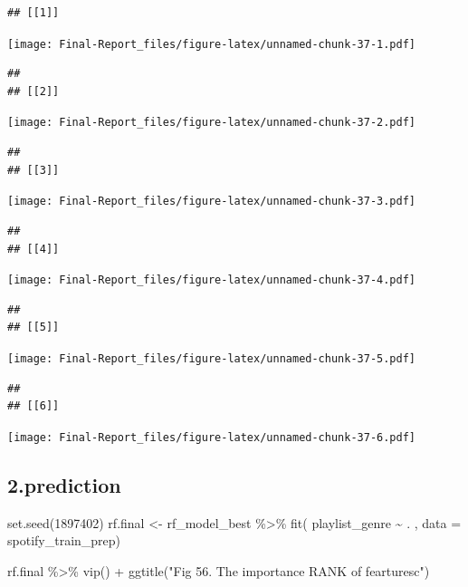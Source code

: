 \documentclass[
]{article}
\newenvironment{Shaded}{\begin{snugshade}}{\end{snugshade}}
\newcommand{\AttributeTok}[1]{\textcolor[rgb]{0.77,0.63,0.00}{#1}}
\newcommand{\DecValTok}[1]{\textcolor[rgb]{0.00,0.00,0.81}{#1}}
\newcommand{\FunctionTok}[1]{\textcolor[rgb]{0.00,0.00,0.00}{#1}}
\newcommand{\NormalTok}[1]{#1}
\newcommand{\OtherTok}[1]{\textcolor[rgb]{0.56,0.35,0.01}{#1}}
\newcommand{\SpecialCharTok}[1]{\textcolor[rgb]{0.00,0.00,0.00}{#1}}
\newcommand{\StringTok}[1]{\textcolor[rgb]{0.31,0.60,0.02}{#1}}
\begin{document}
\begin{verbatim}
## [[1]]
\end{verbatim}

\texttt{[image: Final-Report\_files/figure-latex/unnamed-chunk-37-1.pdf]}

\begin{verbatim}
## 
## [[2]]
\end{verbatim}

\texttt{[image: Final-Report\_files/figure-latex/unnamed-chunk-37-2.pdf]}

\begin{verbatim}
## 
## [[3]]
\end{verbatim}

\texttt{[image: Final-Report\_files/figure-latex/unnamed-chunk-37-3.pdf]}

\begin{verbatim}
## 
## [[4]]
\end{verbatim}

\texttt{[image: Final-Report\_files/figure-latex/unnamed-chunk-37-4.pdf]}

\begin{verbatim}
## 
## [[5]]
\end{verbatim}

\texttt{[image: Final-Report\_files/figure-latex/unnamed-chunk-37-5.pdf]}

\begin{verbatim}
## 
## [[6]]
\end{verbatim}

\texttt{[image: Final-Report\_files/figure-latex/unnamed-chunk-37-6.pdf]}

\hypertarget{prediction}{%
\subsection{2.prediction}\label{prediction}}

\begin{Shaded}
\begin{Highlighting}[]
\FunctionTok{set.seed}\NormalTok{(}\DecValTok{1897402}\NormalTok{)}
\NormalTok{rf.final }\OtherTok{\textless{}{-}}\NormalTok{ rf\_model\_best }\SpecialCharTok{\%\textgreater{}\%}
  \FunctionTok{fit}\NormalTok{( playlist\_genre }\SpecialCharTok{\textasciitilde{}}\NormalTok{ . , }\AttributeTok{data =}\NormalTok{ spotify\_train\_prep)}

\NormalTok{rf.final }\SpecialCharTok{\%\textgreater{}\%} \FunctionTok{vip}\NormalTok{() }\SpecialCharTok{+} \FunctionTok{ggtitle}\NormalTok{(}\StringTok{"Fig 56. The importance RANK of fearturesc"}\NormalTok{)}
\end{Highlighting}
\end{Shaded}
\end{document}
